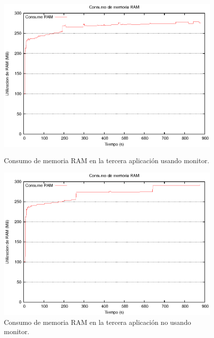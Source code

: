 \begin{figure}[!hptb]
\end{figure}

\begin{figure}[!hptb]
\centering

\begin{minipage}[c]{0.45\textwidth}
\centering
    \includegraphics[width=\textwidth]{images/exp/app3/cm/fisical/consumeRAM.eps}
    \caption{Consumo de memoria RAM en la tercera aplicación usando monitor.}
    \label{fig:app3-consumeRAM-cm}
\end{minipage} \hspace*{1cm}
\begin{minipage}[c]{0.45\textwidth}
\centering
    \includegraphics[width=\textwidth]{images/exp/app3/sm/fisical/consumeRAM.eps}
    \caption{Consumo de memoria RAM en la tercera aplicación no usando monitor.}
    \label{fig:app3-consumeRAM-sm}
\end{minipage}

\end{figure}

